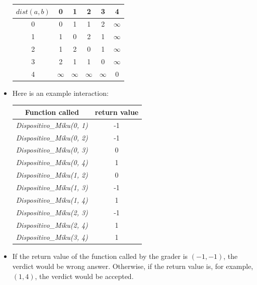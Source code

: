 \documentclass[12pt]{scrartcl}
\begin{document}
\begin{itemize}
            \begin{center}
                \begin{tabular}{|c||c|c|c|c|c|}
                    \hline
                    $dist(a, b)$ & 0 & 1 & 2 & 3 & 4 \\
                    \hline
                    \hline
                     0 & 0 & 1 & 1 & 2 & $\infty$ \\
                     \hline
                     1 & 1 & 0 & 2 & 1 & $\infty$ \\
                     \hline
                     2 & 1 & 2 & 0 & 1 & $\infty$ \\
                     \hline
                     3 & 2 & 1 & 1 & 0 & $\infty$ \\
                     \hline
                     4 & $\infty$ & $\infty$ & $\infty$ & $\infty$ & 0 \\
                     \hline 
                \end{tabular}
            \end{center}
            \item Here is an example interaction:
            \begin{center}
                \begin{tabular}{|c|c|}
                    \hline
                     Function called &  return value \\
                     \hline 
                     \hline 
                     \textit{Dispositivo\_Miku(0, 1)} & -1 \\
                     \hline 
                     \textit{Dispositivo\_Miku(0, 2)} & -1 \\
                     \hline 
                     \textit{Dispositivo\_Miku(0, 3)} & 0 \\
                     \hline 
                     \textit{Dispositivo\_Miku(0, 4)} & 1 \\
                     \hline 
                     \textit{Dispositivo\_Miku(1, 2)} & 0 \\
                     \hline 
                     \textit{Dispositivo\_Miku(1, 3)} & -1 \\
                     \hline 
                     \textit{Dispositivo\_Miku(1, 4)} & 1 \\
                     \hline 
                     \textit{Dispositivo\_Miku(2, 3)} & -1 \\
                     \hline 
                     \textit{Dispositivo\_Miku(2, 4)} & 1 \\
                     \hline 
                     \textit{Dispositivo\_Miku(3, 4)} & 1 \\
                     \hline 
                \end{tabular}
            \end{center}
            \item If the return value of the function called by the grader is $(-1, -1)$, the verdict would be wrong answer. Otherwise, if the return value is, for example, $(1, 4)$, the verdict would be accepted.
        \end{itemize}
        
\end{document}
